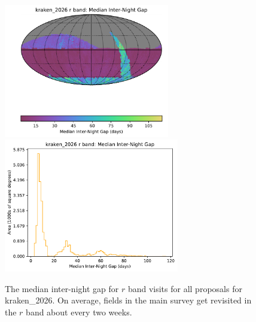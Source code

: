 \documentclass[DM,lsstdraft,authoryear,toc]{lsstdoc}
\begin{document}
\begin{figure}[htb]
\centering
\vskip -0.0in
\includegraphics[height=2.3in]{figures/kraken_2026_Median_Inter-Night_Gap_r_band_HEAL_SkyMap.pdf}
\includegraphics[height=2.3in]{figures/kraken_2026_Median_Inter-Night_Gap_r_band_HEAL_Histogram.pdf}
\vskip -0.1in
\caption{The median inter-night gap for $r$ band visits for all proposals for kraken\_2026.
On average, fields in the main survey get revisited in the $r$ band about every two weeks.}
\label{fig:baseline_Gapr}
\end{figure}
\end{document}
